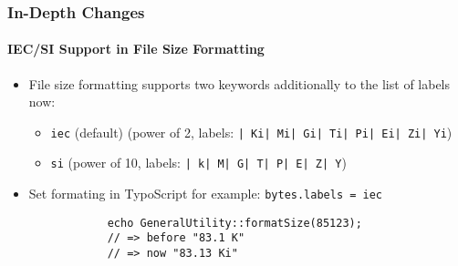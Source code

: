 \begin{frame}[fragile]
	\frametitle{In-Depth Changes}
	\framesubtitle{IEC/SI Support in File Size Formatting}


	\begin{itemize}

		\item File size formatting supports two keywords additionally to the list of labels now:

			\begin{itemize}
				\item \small\texttt{iec} (default)\newline
					\small(power of 2, labels: \texttt{| Ki| Mi| Gi| Ti| Pi| Ei| Zi| Yi})\normalsize
				\item \small\texttt{si}\newline
					\small(power of 10, labels: \texttt{| k| M| G| T| P| E| Z| Y})\normalsize
			\end{itemize}

		\item Set formating in TypoScript for example:\newline
			\texttt{bytes.labels = iec}

		\begin{lstlisting}
			echo GeneralUtility::formatSize(85123);
			// => before "83.1 K"
			// => now "83.13 Ki"
		\end{lstlisting}

	\end{itemize}

\end{frame}


